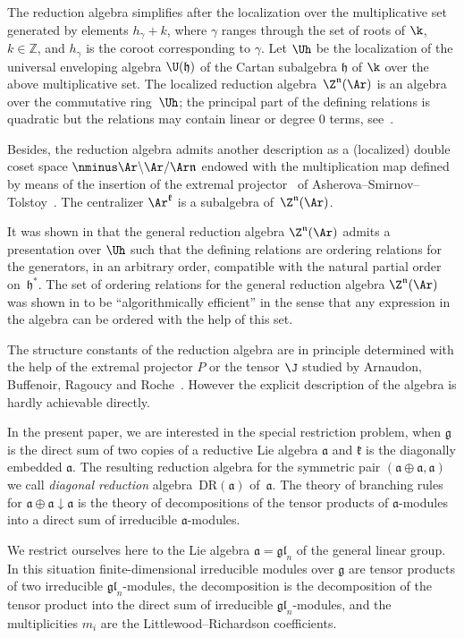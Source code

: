 \documentclass[pdftex]{sigma}
\def\f{\mathfrak{k}}\def\h{\mathfrak{h}}\def\hs{\mathring{z}}\def\g{\mathfrak{g}}\def\sl{\mathfrak{sl}}\def\gl{\mathfrak{gl}}
\def\nplus{\mathfrak{n}}\def\nn{\nonumber}\def\nin{\noindent}
\def\Zp{\Z^{\nplus}}\def\z{z}\let\mmult=\mult\newcommand{\CC}{{\mathbb C}}\newcommand{\NN}{{\mathbb N}}
\newcommand{\ZZ}{{\mathbb Z}}\def\Hom{\operatorname{Hom}}\def\I{\mathrm{I}}
\numberwithin{equation}{section}
\begin{document}
The reduction algebra simplif\/ies  after the localization over the multiplicative set generated by elements $h_\gamma+k$, where $\gamma$
ranges through the set of roots of $\k$, $k\in\ZZ$, and $h_\gamma$ is the coroot corresponding to $\gamma$. Let $\Uh$ be the localization of the universal
enveloping algebra $\U(\h)$ of the Cartan subalgebra $\h$ of $\k$ over the above multiplicative set. The localized reduction algebra~$\Zp(\Ar)$ is
an algebra over the commutative ring~$\Uh$; the principal part of the def\/ining relations is quadratic but the relations may contain linear or degree 0 terms, see~\cite{Zh,KO}.

Besides, the reduction algebra admits another description as a (localized) double coset space $\nminus\Ar\backslash \Ar/\Ar \nplus$ endowed with the
multiplication map def\/ined by means of the insertion of the extremal projector~\cite{KO} of Asherova--Smirnov--Tolstoy~\cite{AST}. The centralizer $\Ar^\f$ is a subalgebra of~$\Zp(\Ar)$.


It was shown in \cite{KO3} that the general reduction algebra $\Zp(\Ar)$ admits a presentation over $\Uh$ such that the def\/ining relations are
ordering relations for the generators, in an arbitrary order, compatible with the natural partial order on~$\h^*$.
The set of ordering relations for the general reduction algebra $\Zp(\Ar)$ was shown in \cite{KO3} to be ``algorithmically ef\/f\/icient'' in the sense that any
expression in the algebra can be ordered with the help of this set.


The structure constants of the reduction algebra are in principle determined with the help of the extremal projector $P$ or the tensor $\J$ studied by
Arnaudon,  Buf\/fenoir, Ragoucy and Roche~\cite{ABRR}. However the explicit description of the algebra is hardly achievable directly.


In the present paper, we are interested in the special restriction problem, when $\g$ is the direct sum of two copies of a
reductive Lie algebra ${\mathfrak a}$ and $\f$ is the diagonally embedded ${\mathfrak a}$. The resulting reduction algebra for the symmetric pair
$({\mathfrak a}\oplus {\mathfrak a}, {\mathfrak a})$ we call {\em diagonal reduction} algebra~${\mathrm{DR}}({\mathfrak a})$ of~${\mathfrak a}$.  The theory of branching rules for ${\mathfrak a}\oplus {\mathfrak a}\downarrow {\mathfrak a}$ is the theory of
decompositions of the tensor products of ${\mathfrak a}$-modules into a direct sum of irreducible ${\mathfrak a}$-modules.


We restrict ourselves here to the Lie algebra ${\mathfrak a}=\gl_n$ of the general linear group. In this situation f\/inite-dimensional irreducible modules over $\g$
are tensor products of two irreducible $\gl_n$-modules, the decomposition  is the decomposition of the tensor product into the direct sum of irreducible
$\gl_n$-modules, and the multiplicities $m_i$ are the Littlewood--Richardson coef\/f\/icients.
\end{document}
